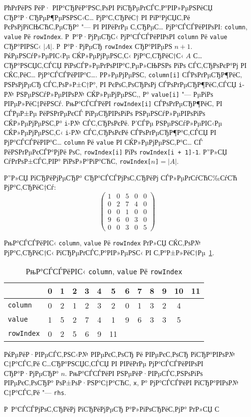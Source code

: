 \documentclass[bachelor, och, pract]{SCWorks}
\begin{document}
РћРґРёРЅ РёР· РІР°СЂРёР°РЅС‚РѕРІ РїСЂРµРґСЃС‚Р°РІР»РµРЅРёСЏ СЂР°Р·СЂРµР¶РµРЅРЅС‹С… РјР°С‚СЂРёС† РІ РїР°РјСЏС‚Рё РєРѕРјРїСЊСЋС‚РµСЂР° "--- РІ РІРёРґРµ С‚СЂРµС… РјР°СЃСЃРёРІРѕРІ: \verb"column", \verb"value" Рё \verb"rowIndex". Р Р°Р·РјРµСЂС‹ РјР°СЃСЃРёРІРѕРІ \verb"column" Рё \verb"value" СЂР°РІРЅС‹ $|A|$. Р Р°Р·РјРµСЂ \verb"rowIndex" СЂР°РІРµРЅ $n+1$. РќРµРЅСѓР»РµРІС‹Рµ СЌР»РµРјРµРЅС‚С‹ РјР°С‚СЂРёС†С‹ $A$ С…СЂР°РЅСЏС‚СЃСЏ РїРѕСЃР»РµРґРѕРІР°С‚РµР»СЊРЅРѕ РїРѕ СЃС‚СЂРѕРєР°Рј РІ СЌС‚РёС… РјР°СЃСЃРёРІР°С…. Р­Р»РµРјРµРЅС‚ \verb"column[i]" СЃРѕРґРµСЂР¶РёС‚ РЅРѕРјРµСЂ СЃС‚РѕР»Р±С†Р°, РІ РєРѕС‚РѕСЂРѕРј СЃРѕРґРµСЂР¶РёС‚СЃСЏ \verb"i"-Р№ РЅРµРЅСѓР»РµРІРѕР№ СЌР»РµРјРµРЅС‚, Р° \verb"value[i]" "--- РµРіРѕ РІРµР»РёС‡РёРЅСѓ. РњР°СЃСЃРёРІ \verb"rowIndex[i]" СЃРѕРґРµСЂР¶РёС‚ РІ СЃРµР±Рµ РёРЅРґРµРєСЃ РїРµСЂРІРѕРіРѕ РЅРµРЅСѓР»РµРІРѕРіРѕ СЌР»РµРјРµРЅС‚Р° \verb"i"-Р№ СЃС‚СЂРѕРєРё. Р’СЃРµ РЅРµРЅСѓР»РµРІС‹Рµ СЌР»РµРјРµРЅС‚С‹ \verb"i"-Р№ СЃС‚СЂРѕРєРё СЃРѕРґРµСЂР¶Р°С‚СЃСЏ РІ РјР°СЃСЃРёРІР°С… \verb"column" Рё \verb"value" РІ СЌР»РµРјРµРЅС‚Р°С… СЃ РёРЅРґРµРєСЃР°РјРё РѕС‚ \verb"rowIndex[i]" РїРѕ \verb"rowIndex[i + 1]-1". Р”Р»СЏ СѓРґРѕР±СЃС‚РІР° РїРѕР»Р°РіР°СЋС‚ \verb"rowIndex["$n$\verb"]"$=|A|$.

Р”Р»СЏ РїСЂРёРјРµСЂР° СЂР°СЃСЃРјРѕС‚СЂРёРј СЃР»РµРґСѓСЋС‰СѓСЋ РјР°С‚СЂРёС†Сѓ:
\[
    \left(
    \begin{matrix}
        1 & 0 & 5 & 0 & 0 \\
        0 & 2 & 7 & 4 & 0 \\
        0 & 0 & 1 & 0 & 0 \\
        9 & 6 & 0 & 3 & 0 \\
        0 & 0 & 3 & 0 & 5
    \end{matrix}
    \right)
\]

РњР°СЃСЃРёРІС‹ \verb"column", \verb"value" Рё \verb"rowIndex" РґР»СЏ СЌС‚РѕР№ РјР°С‚СЂРёС†С‹ РїСЂРµРґСЃС‚Р°РІР»РµРЅС‹ РІ С‚Р°Р±Р»РёС†Рµ~\ref{tab:mat-arrays}.
\begin{table}[ht]\small
	\caption{РњР°СЃСЃРёРІС‹ \texttt{column}, \texttt{value} Рё \texttt{rowIndex}}\label{tab:mat-arrays}
	\begin{tabular}{|l|c|c|c|c|c|c|c|c|c|c|c|c|} \cline{2-13}
		\multicolumn{1}{c|}{} & 0 & 1 & 2 & 3 & 4 & 5 & 6 & 7 & 8 & 9 & 10 & 11 \\ \cline{2-13}\hline
		\verb"column" & 0 & 2 & 1 & 2 & 3 & 2 & 0 & 1 & 3 & 2 & 4 &  \\ \hline\hline
		\verb"value" & 1 & 5 & 2 & 7 & 4 & 1 & 9 & 6 & 3 & 3 & 5 &  \\ \hline\hline
		\verb"rowIndex" & 0 & 2 & 5 & 6 & 9 & 11 &  &  &  &  &  &  \\ \hline
	\end{tabular}
\end{table}

РќРµРёР·РІРµСЃС‚РЅС‹Р№ РІРµРєС‚РѕСЂ Рё РІРµРєС‚РѕСЂ РїСЂР°РІРѕР№ С‡Р°СЃС‚Рё С…СЂР°РЅСЏС‚СЃСЏ РІ РІРёРґРµ РјР°СЃСЃРёРІРѕРІ СЂР°Р·РјРµСЂР° $n$. РњР°СЃСЃРёРІ РЅРµРёР·РІРµСЃС‚РЅРѕРіРѕ РІРµРєС‚РѕСЂР° РѕР±РѕР·РЅР°С‡Р°СЋС‚ \verb"x", Р° РјР°СЃСЃРёРІ РїСЂР°РІРѕР№ С‡Р°СЃС‚Рё "--- \verb"rhs".

Р Р°СЃСЃРјРѕС‚СЂРёРј РїСЂРёРјРµСЂ Р°Р»РіРѕСЂРёС‚РјР° РґР»СЏ С
\end{document}

